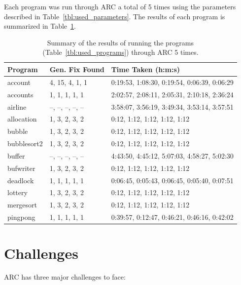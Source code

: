 \documentclass{llncs}
\begin{document}
Each program was run through ARC a total of 5 times using the parameters
described in Table~\ref{tbl:used_parameters}. The results of each program is
summarized in Table~\ref{tbl:summary_results}.

\begin{table}%
\caption{Summary of the results of running the programs
(Table~\ref{tbl:used_programs}) through ARC 5 times.}
\begin{center}
\lstset{basicstyle=\scriptsize}
\begin{tabular}{|l|l|l|}
\hline
\textbf{Program} & \textbf{Gen. Fix Found} & \textbf{Time Taken (h:m:s)}\\
\hline
account & 4, 15, 4, 1, 1 & 0:19:53, 1:08:30, 0:19:54, 0:06:39, 0:06:29\\
\hline
accounts & 1, 1, 1, 1, 1 & 2:02:57, 2:08:11, 2:05:31, 2:10:18, 2:36:24\\
\hline
airline & --, --, --, --, -- & 3:58:07, 3:56:19, 3:49:34, 3:53:14, 3:57:51\\
\hline
allocation & 1, 3, 2, 3, 2 & 0:12, 1:12, 1:12, 1:12, 1:12\\
\hline
bubble & 1, 3, 2, 3, 2 & 0:12, 1:12, 1:12, 1:12, 1:12\\
\hline
bubblesort2 & 1, 3, 2, 3, 2 & 0:12, 1:12, 1:12, 1:12, 1:12\\
\hline
buffer & --, --, --, --, -- & 4:43:50, 4:45:12, 5:07:03, 4:58:27, 5:02:30\\
\hline
bufwriter & 1, 3, 2, 3, 2 & 0:12, 1:12, 1:12, 1:12, 1:12\\
\hline
deadlock & 1, 1, 1, 1, 1 & 0:06:45, 0:05:43, 0:06:45, 0:05:40, 0:07:51\\
\hline
lottery & 1, 3, 2, 3, 2 & 0:12, 1:12, 1:12, 1:12, 1:12\\
\hline
mergesort & 1, 3, 2, 3, 2 & 0:12, 1:12, 1:12, 1:12, 1:12\\
\hline
pingpong & 1, 1, 1, 1, 1 & 0:39:57, 0:12:47, 0:46:21, 0:46:16, 0:42:02\\
\hline
\end{tabular}
\label{tbl:summary_results}
\end{center}
\end{table}


\section{Challenges}
\label{sec:challenges}

ARC has three major challenges to face:
\end{document}
